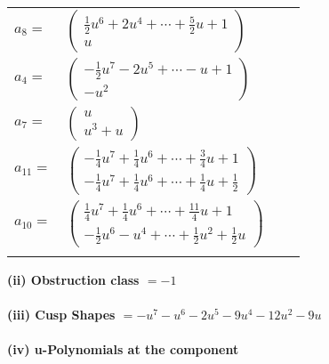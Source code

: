 \documentclass[1p]{elsarticle_modified}
\theoremstyle{definition}
\begin{document}
\begin{tabular}{m{7pt} m{180pt} m{7pt} m{180pt} }
\flushright $a_{8}=$&$\begin{pmatrix}\frac{1}{2} u^6+2 u^4+\cdots+\frac{5}{2} u+1\\u\end{pmatrix}$ \\
\flushright $a_{4}=$&$\begin{pmatrix}-\frac{1}{2} u^7-2 u^5+\cdots- u+1\\- u^2\end{pmatrix}$ \\
\flushright $a_{7}=$&$\begin{pmatrix}u\\u^3+u\end{pmatrix}$ \\
\flushright $a_{11}=$&$\begin{pmatrix}-\frac{1}{4} u^7+\frac{1}{4} u^6+\cdots+\frac{3}{4} u+1\\-\frac{1}{4} u^7+\frac{1}{4} u^6+\cdots+\frac{1}{4} u+\frac{1}{2}\end{pmatrix}$ \\
\flushright $a_{10}=$&$\begin{pmatrix}\frac{1}{4} u^7+\frac{1}{4} u^6+\cdots+\frac{11}{4} u+1\\-\frac{1}{2} u^6- u^4+\cdots+\frac{1}{2} u^2+\frac{1}{2} u\end{pmatrix}$\\&\end{tabular}
\flushleft \textbf{(ii) Obstruction class $= -1$}\\~\\
\flushleft \textbf{(iii) Cusp Shapes $= - u^7- u^6-2 u^5-9 u^4-12 u^2-9 u$}\\~\\
\newpage\renewcommand{\arraystretch}{1}
\flushleft \textbf{(iv) u-Polynomials at the component}\newline \\
\end{document}
